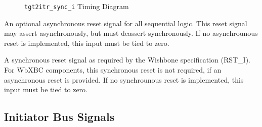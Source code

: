 \begin{description}[style=nextline]
\begin{figure}[!h]
\begin{center}
\begin{tikzpicture}
      \end{tikzpicture}
      \caption[Timing Diagram]{\texttt{tgt2itr\_sync\_i} Timing Diagram}
      \label{sig:tgt2itrsync:fig}
    \end{center}
  \end{figure}

\item[\texttt{async\_rst\_i}] An optional asynchronous reset signal for all sequential logic. This
  reset signal may assert asynchronously, but must deassert synchronously. If no
  asynchrounous reset is implemented, this input must be tied to zero.

\item[\texttt{sync\_rst\_i}] A synchronous reset signal as required by the Wishbone specification (RST\_I).
  For WbXBC components, this synchronous reset is not required, if an asynchronous reset is provided.
  If no synchrounous reset is implemented, this input must be tied to zero.

\end{description}

\subsection{Initiator Bus Signals}

